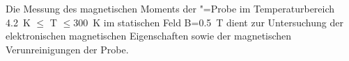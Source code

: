 Die Messung des magnetischen Moments der \aug"=Probe im Temperaturbereich 4.2~K $\le$ T $\le $300~K
im statischen Feld B=0.5~T dient zur Untersuchung der elektronischen magnetischen Eigenschaften
sowie der magnetischen Verunreinigungen der Probe.

 \begin{figure}[htp]
	\begin{center}
		\\
\end{center}
\end{figure}
